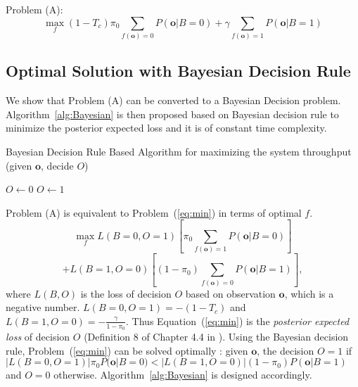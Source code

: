\documentclass[conference]{IEEEtran}
\begin{document}
Problem (A):
\[\max\limits_{f}{(1-T_c){\pi}_0 \sum\limits_{f(\boldsymbol{o})=0}{P(\boldsymbol{o}|B=0)}+\gamma \sum\limits_{f(\boldsymbol{o})=1}{P(\boldsymbol{o}|B=1)}}\]

\subsection{Optimal Solution with Bayesian Decision Rule}
\label{subsec:Bayesian_max}

We show that Problem (A) can be converted to a Bayesian Decision problem. Algorithm~\ref{alg:Bayesian} is then proposed based on Bayesian decision rule to minimize the posterior expected loss \cite{Berger} and it is of constant time complexity.

\begin{algorithm}[t]
    \caption{{\footnotesize Bayesian Decision Rule Based Algorithm for maximizing the system throughput (given $\boldsymbol{o}$, decide $O$)}}\label{alg:Bayesian}
    \begin{algorithmic}[1]
	{\footnotesize {}
		\STATE $O\leftarrow 0$
	\ELSE
		\STATE $O\leftarrow 1$
	\ENDIF}
    \end{algorithmic}
    \vspace{-0.2em}
\end{algorithm}

Problem (A) is equivalent to Problem~(\ref{eq:min}) in terms of optimal $f$. \vspace{-1em}
\[\max\limits_{f}{L(B=0,O=1)\left[{\pi}_0\sum\limits_{f(\boldsymbol{o})=1}{P(\boldsymbol{o}|B=0)}\right]}\]
\vspace{-0.5em}
\begin{equation}
+L(B=1,O=0) \left[(1-{\pi}_0)\sum\limits_{f(\boldsymbol{o})=0}{P(\boldsymbol{o}|B=1)}\right],
\label{eq:min}
\end{equation}
where $L(B,O)$ is the loss of decision $O$ based on observation $\boldsymbol{o}$, which is a negative number. $L(B=0,O=1)=-(1-T_c)$ and $L(B=1,O=0)=-\frac{\gamma}{1-{\pi}_0}$. Thus Equation~(\ref{eq:min}) is the \emph{posterior expected loss} of decision $O$ (Definition $8$ of Chapter 4.4 in \cite{Berger}). Using the Bayesian decision rule, Problem~(\ref{eq:min}) can be solved optimally \cite{Berger}: given $\boldsymbol{o}$, the decision $O=1$ if $|L(B=0,O=1)|{\pi}_0 P(\boldsymbol{o}|B=0)<|L(B=1,O=0)|(1-{\pi}_0)P(\boldsymbol{o}|B=1)$ and $O=0$ otherwise. Algorithm~\ref{alg:Bayesian} is designed accordingly.   
\end{document}
